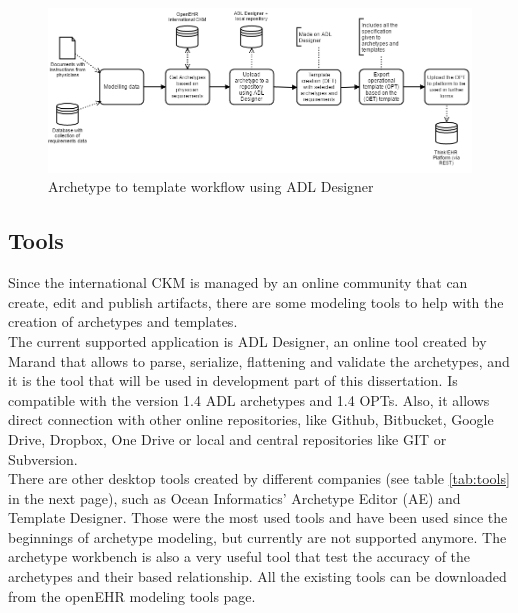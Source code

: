 \documentclass[mim_thesis.tex]{subfiles}
\begin{document}
\begin{figure}[H]
	\centering
    \includegraphics[width=1.1\textwidth]{img/OET_OPT.PNG}
	\caption{Archetype to template workflow using ADL Designer}
	\label{fig:OET_OPT}
\end{figure}



\subsection{Tools}
Since the international CKM is managed by an online community that can create, edit and publish artifacts, there are some modeling tools to help with the creation of archetypes and templates.\\ 

The current supported application is ADL Designer, an online tool created by Marand that allows to parse, serialize, flattening and validate the archetypes, and it is the tool that will be used in development part of this dissertation. Is compatible with the version 1.4 ADL archetypes and 1.4 OPTs. Also, it allows direct connection with other online repositories, like Github, Bitbucket, Google Drive, Dropbox, One Drive or local and central repositories like GIT or Subversion.\\ 

There are other desktop tools created by different companies (see table \ref{tab:tools} in the next page), such as Ocean Informatics’ Archetype Editor (AE) and Template Designer. Those were the most used tools and have been used since the beginnings of archetype modeling, but currently are not supported anymore. The archetype workbench is also a very useful tool that test the accuracy of the archetypes and their based relationship. All the existing tools can be downloaded from the openEHR modeling tools page. 
\vfill
~
\end{document}

